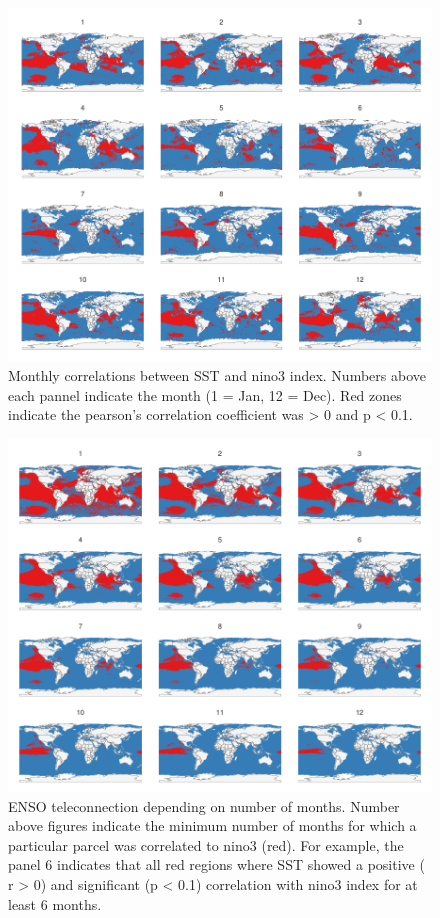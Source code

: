 \documentclass[11pt]{article}
\begin{document}
\begin{figure}
\centering
\includegraphics{../img/cor_sst_nino3.pdf}
\caption{Monthly correlations between SST and nino3 index. Numbers above each pannel indicate the month (1 = Jan, 12 = Dec).
Red zones indicate the pearson's correlation coefficient was \textgreater{} 0 and p \textless{} 0.1.}
\end{figure}

\begin{figure}
\centering
\includegraphics{../img/cor_sst_nino3_var.pdf}
\caption{ENSO teleconnection depending on number of months. Number above figures indicate the minimum number of months for which a particular
parcel was correlated to nino3 (red). For example, the panel 6 indicates that all red regions where SST showed a positive ( r \textgreater{} 0)
and significant (p \textless{} 0.1) correlation with nino3 index for at least 6 months.}
\end{figure}
\end{document}
